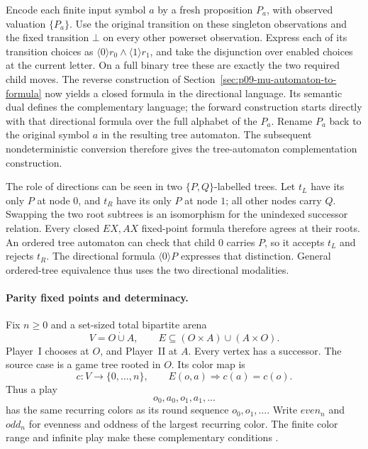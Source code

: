 Encode each finite input
symbol \(a\) by a
fresh proposition \(P_a\),
with observed valuation
\(\{P_a\}\).
Use the original transition
on these singleton observations
and the fixed transition
\(\bot\) on every other
powerset observation.
Express each of its
transition choices as
\(\langle0\rangle r_0
 \land\langle1\rangle r_1\),
and take the disjunction
over enabled choices at
the current letter.
On a full binary tree
these are exactly the
two required child moves.
The reverse construction
of Section~\ref{sec:p09-mu-automaton-to-formula}
now yields a closed
formula in the directional
language.
Its semantic dual defines
the complementary language;
the forward construction
starts directly with that
directional formula over the
full alphabet of the \(P_a\).
Rename \(P_a\) back to
the original symbol \(a\)
in the resulting tree automaton.
The subsequent nondeterministic
conversion therefore gives
the tree-automaton complementation
construction.

The role of directions
can be seen in two
\(\{P,Q\}\)-labelled trees.
Let \(t_L\) have its
only \(P\) at node
\(0\), and \(t_R\)
have its only \(P\)
at node \(1\); all
other nodes carry \(Q\).
Swapping the two root
subtrees is an isomorphism
for the unindexed successor
relation. Every closed \(EX,AX\)
fixed-point formula therefore
agrees at their roots.
An ordered tree automaton
can check that child
\(0\) carries \(P\),
so it accepts \(t_L\)
and rejects \(t_R\).
The directional formula
\(\langle0\rangle P\)
expresses that distinction.
General ordered-tree equivalence
thus uses the two
directional modalities.

\paragraph{Parity fixed points and determinacy.}
\label{sec:p09-emerson-jutla-parity-formulas}
Fix \(n\geq0\) and a
set-sized total bipartite arena
\[
 V=O\mathbin{\dot\cup}A,\qquad
 E\subseteq(O\times A)\cup(A\times O).
\]
Player~I chooses at \(O\),
and Player~II at \(A\).
Every vertex has a successor.
The source case is a
game tree rooted in \(O\).
Its color map is
\[
 c:V\longrightarrow\{0,\ldots,n\},\qquad
 E(o,a)\Longrightarrow c(a)=c(o).
\]
Thus a play
\[
 o_0,a_0,o_1,a_1,\ldots
\]
has the same recurring
colors as its round
sequence \(o_0,o_1,\ldots\).
Write \(even_n\) and
\(odd_n\) for evenness
and oddness of the
largest recurring color.
The finite color range
and infinite play make
these complementary conditions
\cite[def.~4.0]{EmersonJutla1991}.

